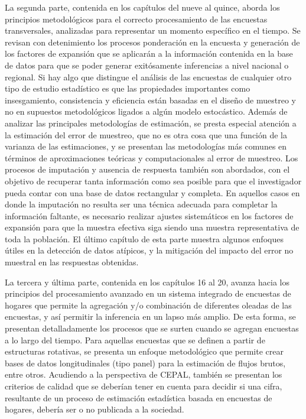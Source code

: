 \documentclass[
  12pt,
]{book}
\begin{document}
La segunda parte, contenida en los capítulos del nueve al quince, aborda los principios metodológicos para el correcto procesamiento de las encuestas transversales, analizadas para representar un momento específico en el tiempo. Se revisan con detenimiento los procesos ponderación en la encuesta y generación de los factores de expansión que se aplicarán a la información contenida en la base de datos para que se poder generar exitósamente inferencias a nivel nacional o regional. Si hay algo que distingue el análisis de las encuestas de cualquier otro tipo de estudio estadístico es que las propiedades importantes como insesgamiento, consistencia y eficiencia están basadas en el diseño de muestreo y no en supuestos metodológicos ligados a algún modelo estocástico. Además de analizar las principales metodologías de estimación, se presta especial atención a la estimación del error de muestreo, que no es otra cosa que una función de la varianza de las estimaciones, y se presentan las metodologías más comunes en términos de aproximaciones teóricas y computacionales al error de muestreo. Los procesos de imputación y ausencia de respuesta también son abordados, con el objetivo de recuperar tanta información como sea posible para que el investigador pueda contar con una base de datos rectangular y completa. En aquellos casos en donde la imputación no resulta ser una técnica adecuada para completar la información faltante, es necesario realizar ajustes sistemáticos en los factores de expansión para que la muestra efectiva siga siendo una muestra representativa de toda la población. El último capítulo de esta parte muestra algunos enfoques útiles en la detección de datos atípicos, y la mitigación del impacto del error no muestral en las respuestas obtenidas.

La tercera y última parte, contenida en los capítulos 16 al 20, avanza hacia los principios del procesamiento avanzado en un sistema integrado de encuestas de hogares que permite la agregación y/o combinación de diferentes oleadas de las encuestas, y así permitir la inferencia en un lapso más amplio. De esta forma, se presentan detalladamente los procesos que se surten cuando se agregan encuestas a lo largo del tiempo. Para aquellas encuestas que se definen a partir de estructuras rotativas, se presenta un enfoque metodológico que permite crear bases de datos longitudinales (tipo panel) para la estimación de flujos brutos, entre otros. Acudiendo a la perspectiva de CEPAL, también se presentan los criterios de calidad que se deberían tener en cuenta para decidir si una cifra, resultante de un proceso de estimación estadística basada en encuestas de hogares, debería ser o no publicada a la sociedad.
\end{document}
